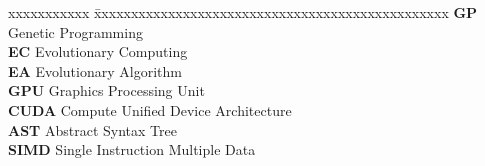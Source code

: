 \abbreviations
 
\noindent 
\begin{tabbing}
xxxxxxxxxxx \= xxxxxxxxxxxxxxxxxxxxxxxxxxxxxxxxxxxxxxxxxxxxxxxx \kill
\textbf{GP}     \> Genetic Programming \\
\textbf{EC}     \> Evolutionary Computing \\
\textbf{EA}     \> Evolutionary Algorithm \\
\textbf{GPU}    \> Graphics Processing Unit \\
\textbf{CUDA}   \> Compute Unified Device Architecture \\
\textbf{AST}    \> Abstract Syntax Tree \\
\textbf{SIMD} \> Single Instruction Multiple Data \\
\end{tabbing}


